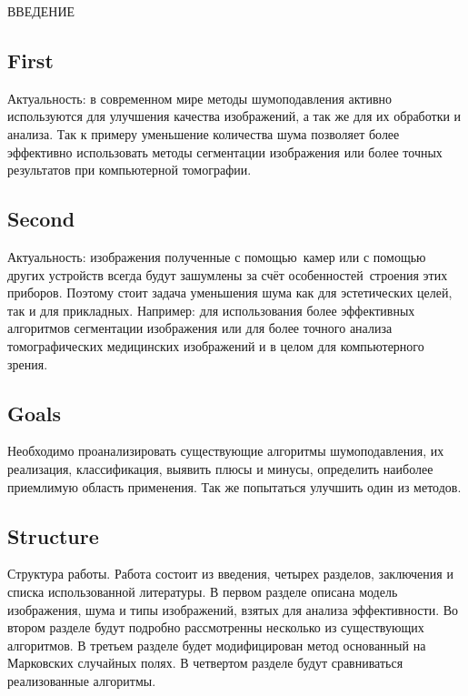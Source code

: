 ВВЕДЕНИЕ
\subsection{First}
Актуальность: в современном мире методы шумоподавления активно используются для улучшения качества изображений, а так же для их обработки и анализа. Так к примеру уменьшение количества шума позволяет более эффективно использовать методы сегментации изображения или более точных результатов при компьютерной томографии.
\subsection{Second}
Актуальность: изображения полученные с помощью камер или с помощью других устройств всегда будут зашумлены за счёт особенностей строения этих приборов. Поэтому стоит задача уменьшения шума как для эстетических целей, так и для прикладных. Например: для использования более эффективных алгоритмов сегментации изображения или для более точного анализа томографических медицинских изображений и в целом для компьютерного зрения.
\subsection{Goals}
Необходимо проанализировать существующие алгоритмы шумоподавления, их реализация, классификация, выявить плюсы и минусы, определить наиболее приемлимую область применения. Так же попытаться улучшить один из методов.
\subsection{Structure}
Структура работы. Работа состоит из введения, четырех разделов, заключения и списка использованной литературы. В первом разделе  описана модель изображения, шума и типы изображений, взятых для анализа эффективности. Во втором разделе будут подробно рассмотренны несколько из существующих алгоритмов. В третьем разделе будет модифицирован метод основанный на Марковских случайных полях. В четвертом разделе будут сравниваться реализованные алгоритмы. 